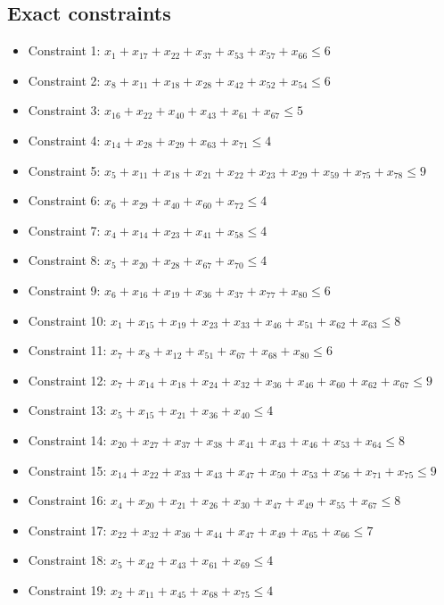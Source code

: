 \documentclass[11pt]{article}
\begin{document}
\subsection*{Exact constraints}
\begin{itemize}
\item Constraint 1: $x_{1} + x_{17} + x_{22} + x_{37} + x_{53} + x_{57} + x_{66} \le 6$
\item Constraint 2: $x_{8} + x_{11} + x_{18} + x_{28} + x_{42} + x_{52} + x_{54} \le 6$
\item Constraint 3: $x_{16} + x_{22} + x_{40} + x_{43} + x_{61} + x_{67} \le 5$
\item Constraint 4: $x_{14} + x_{28} + x_{29} + x_{63} + x_{71} \le 4$
\item Constraint 5: $x_{5} + x_{11} + x_{18} + x_{21} + x_{22} + x_{23} + x_{29} + x_{59} + x_{75} + x_{78} \le 9$
\item Constraint 6: $x_{6} + x_{29} + x_{40} + x_{60} + x_{72} \le 4$
\item Constraint 7: $x_{4} + x_{14} + x_{23} + x_{41} + x_{58} \le 4$
\item Constraint 8: $x_{5} + x_{20} + x_{28} + x_{67} + x_{70} \le 4$
\item Constraint 9: $x_{6} + x_{16} + x_{19} + x_{36} + x_{37} + x_{77} + x_{80} \le 6$
\item Constraint 10: $x_{1} + x_{15} + x_{19} + x_{23} + x_{33} + x_{46} + x_{51} + x_{62} + x_{63} \le 8$
\item Constraint 11: $x_{7} + x_{8} + x_{12} + x_{51} + x_{67} + x_{68} + x_{80} \le 6$
\item Constraint 12: $x_{7} + x_{14} + x_{18} + x_{24} + x_{32} + x_{36} + x_{46} + x_{60} + x_{62} + x_{67} \le 9$
\item Constraint 13: $x_{5} + x_{15} + x_{21} + x_{36} + x_{40} \le 4$
\item Constraint 14: $x_{20} + x_{27} + x_{37} + x_{38} + x_{41} + x_{43} + x_{46} + x_{53} + x_{64} \le 8$
\item Constraint 15: $x_{14} + x_{22} + x_{33} + x_{43} + x_{47} + x_{50} + x_{53} + x_{56} + x_{71} + x_{75} \le 9$
\item Constraint 16: $x_{4} + x_{20} + x_{21} + x_{26} + x_{30} + x_{47} + x_{49} + x_{55} + x_{67} \le 8$
\item Constraint 17: $x_{22} + x_{32} + x_{36} + x_{44} + x_{47} + x_{49} + x_{65} + x_{66} \le 7$
\item Constraint 18: $x_{5} + x_{42} + x_{43} + x_{61} + x_{69} \le 4$
\item Constraint 19: $x_{2} + x_{11} + x_{45} + x_{68} + x_{75} \le 4$

\end{itemize}
\end{document}
